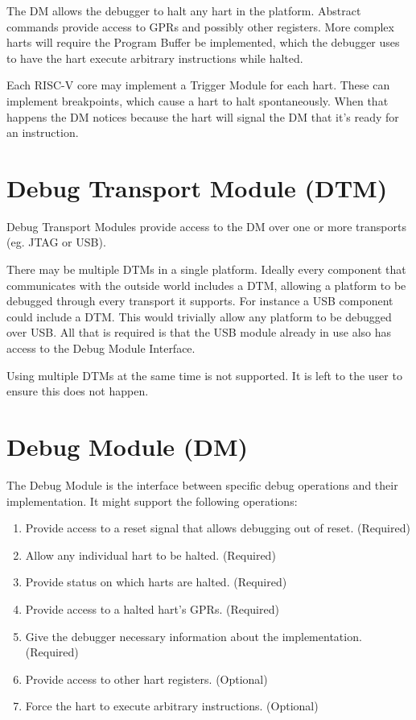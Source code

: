 \documentclass{article}
\newenvironment{steps}[1]
{
   \vspace{1ex}
   \noindent
   #1
   \begin{enumerate}[nosep]
}
{
   \end{enumerate}
   \vspace{1ex}
}
\begin{document}
The DM allows the debugger to halt any hart in the platform. Abstract commands
provide access to GPRs and possibly other registers. More complex harts will
require the Program Buffer be implemented, which the debugger uses to have the
hart execute arbitrary instructions while halted.

Each RISC-V core may implement a Trigger Module for each hart.  These can
implement breakpoints, which cause a hart to halt spontaneously.  When that
happens the DM notices because the hart will signal the DM that it's ready for
an instruction.

\section{Debug Transport Module (DTM)}

Debug Transport Modules provide access to the DM over one or more transports
(eg. JTAG or USB).

There may be multiple DTMs in a single platform. Ideally every component that
communicates with the outside world includes a DTM, allowing a platform to be
debugged through every transport it supports.  For instance a USB component
could include a DTM. This would trivially allow any platform to be debugged
over USB. All that is required is that the USB module already in use also has
access to the Debug Module Interface.

Using multiple DTMs at the same time is not supported. It is left to the user
to ensure this does not happen.

\section{Debug Module (DM)} \label{dm}

\begin{steps}{The Debug Module is the interface between specific debug
    operations and their implementation. It might support the following
    operations:}
\item Provide access to a reset signal that allows debugging out of reset.
    (Required)
\item Allow any individual hart to be halted. (Required)
\item Provide status on which harts are halted. (Required)
\item Provide access to a halted hart's GPRs. (Required)
\item Give the debugger necessary information about the implementation.
    (Required)
\item Provide access to other hart registers. (Optional)
\item Force the hart to execute arbitrary instructions. (Optional)
\end{steps}
\end{document}
